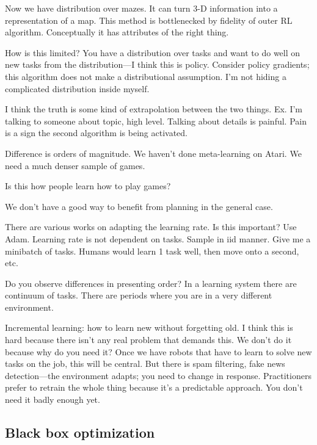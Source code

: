 Now we have distribution over mazes. It can turn 3-D information into a representation of a map.
This method is bottlenecked by fidelity of outer RL algorithm. Conceptually it has attributes of the right thing.

How is this limited? You have a distribution over tasks and want to do well on new tasks from the distribution---I think this is policy. Consider policy gradients; this algorithm does not make a distributional assumption. I'm not hiding a complicated distribution inside myself. 

I think the truth is some kind of extrapolation between the two things. %
Ex. I'm talking to someone about topic, high level. Talking about details is painful. Pain is a sign the second algorithm is being activated.

Difference is orders of magnitude.
We haven't done meta-learning on Atari. We need a much denser sample of games.

Is this how people learn how to play games? %

We don't have a good way to benefit from planning in the general case.

There are various works on adapting the learning rate. Is this important? Use Adam. Learning rate is not dependent on tasks. Sample in iid manner. Give me a minibatch of tasks. Humans would learn 1 task well, then move onto a second, etc.

Do you observe differences in presenting order? In a learning system there are continuum of tasks. There are periods where you are in a very different environment. 

Incremental learning: how to learn new without forgetting old. I think this is hard because there isn't any real problem that demands this. We don't do it because why do you need it? Once we have robots that have to learn to solve new tasks on the job, this will be central.
But there is spam filtering, fake news detection---the environment adapts; you need to change in response.
Practitioners prefer to retrain the whole thing because it's a predictable approach. You don't need it badly enough yet.

\subsection{Black box optimization}

